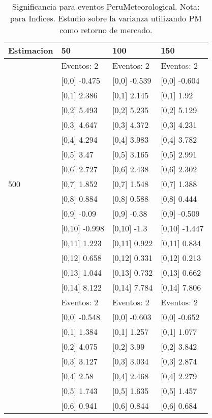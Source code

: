 \begin{table}

\caption{Significancia para eventos PeruMeteorological. Nota: para Indices. Estudio sobre la varianza utilizando PM como retorno de mercado.}
\centering
\begin{tabular}[t]{llll}
\toprule
Estimacion & 50 & 100 & 150\\
\midrule
 & Eventos:  2 & Eventos:  2 & Eventos:  2\\
 & {}[0,0] -0.475 & {}[0,0] -0.539 & {}[0,0] -0.604\\
 & {}[0,1] 2.386 & {}[0,1] 2.145 & {}[0,1] 1.92\\
 & {}[0,2] 5.493 & {}[0,2] 5.235 & {}[0,2] 5.129\\
 & {}[0,3] 4.647 & {}[0,3] 4.372 & {}[0,3] 4.231\\
\addlinespace
 & {}[0,4] 4.294 & {}[0,4] 3.983 & {}[0,4] 3.782\\
 & {}[0,5] 3.47 & {}[0,5] 3.165 & {}[0,5] 2.991\\
 & {}[0,6] 2.727 & {}[0,6] 2.438 & {}[0,6] 2.302\\
500 & {}[0,7] 1.852 & {}[0,7] 1.548 & {}[0,7] 1.388\\
 & {}[0,8] 0.884 & {}[0,8] 0.588 & {}[0,8] 0.444\\
\addlinespace
 & {}[0,9] -0.09 & {}[0,9] -0.38 & {}[0,9] -0.509\\
 & {}[0,10] -0.998 & {}[0,10] -1.3 & {}[0,10] -1.447\\
 & {}[0,11] 1.223 & {}[0,11] 0.922 & {}[0,11] 0.834\\
 & {}[0,12] 0.658 & {}[0,12] 0.331 & {}[0,12] 0.213\\
 & {}[0,13] 1.044 & {}[0,13] 0.732 & {}[0,13] 0.662\\
\addlinespace
 & {}[0,14] 8.122 & {}[0,14] 7.784 & {}[0,14] 7.806\\
 & Eventos:  2 & Eventos:  2 & Eventos:  2\\
 & {}[0,0] -0.548 & {}[0,0] -0.603 & {}[0,0] -0.652\\
 & {}[0,1] 1.384 & {}[0,1] 1.257 & {}[0,1] 1.077\\
 & {}[0,2] 4.075 & {}[0,2] 3.99 & {}[0,2] 3.842\\
\addlinespace
 & {}[0,3] 3.127 & {}[0,3] 3.034 & {}[0,3] 2.874\\
 & {}[0,4] 2.58 & {}[0,4] 2.468 & {}[0,4] 2.279\\
 & {}[0,5] 1.743 & {}[0,5] 1.635 & {}[0,5] 1.457\\
 & {}[0,6] 0.941 & {}[0,6] 0.844 & {}[0,6] 0.684\\

\end{tabular}
\end{table}
